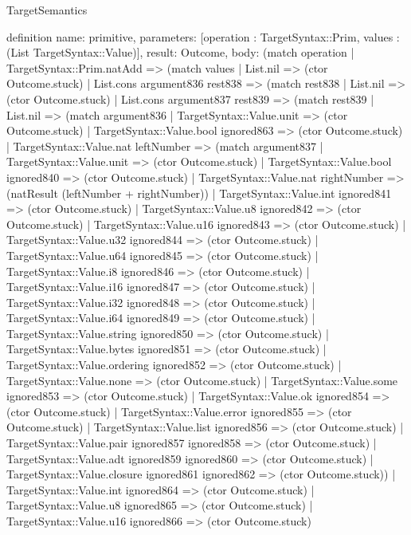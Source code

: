 \begin{lexlean}{TargetSemantics}
\begin{semanticmodule}
definition{
  name: primitive,
  parameters: [operation : TargetSyntax::Prim, values : (List TargetSyntax::Value)],
  result: Outcome,
  body: (match operation
    | TargetSyntax::Prim.natAdd => (match values
      | List.nil => (ctor Outcome.stuck)
      | List.cons argument836 rest838 => (match rest838
        | List.nil => (ctor Outcome.stuck)
        | List.cons argument837 rest839 => (match rest839
          | List.nil => (match argument836
            | TargetSyntax::Value.unit => (ctor Outcome.stuck)
            | TargetSyntax::Value.bool ignored863 => (ctor Outcome.stuck)
            | TargetSyntax::Value.nat leftNumber => (match argument837
              | TargetSyntax::Value.unit => (ctor Outcome.stuck)
              | TargetSyntax::Value.bool ignored840 => (ctor Outcome.stuck)
              | TargetSyntax::Value.nat rightNumber => (natResult (leftNumber + rightNumber))
              | TargetSyntax::Value.int ignored841 => (ctor Outcome.stuck)
              | TargetSyntax::Value.u8 ignored842 => (ctor Outcome.stuck)
              | TargetSyntax::Value.u16 ignored843 => (ctor Outcome.stuck)
              | TargetSyntax::Value.u32 ignored844 => (ctor Outcome.stuck)
              | TargetSyntax::Value.u64 ignored845 => (ctor Outcome.stuck)
              | TargetSyntax::Value.i8 ignored846 => (ctor Outcome.stuck)
              | TargetSyntax::Value.i16 ignored847 => (ctor Outcome.stuck)
              | TargetSyntax::Value.i32 ignored848 => (ctor Outcome.stuck)
              | TargetSyntax::Value.i64 ignored849 => (ctor Outcome.stuck)
              | TargetSyntax::Value.string ignored850 => (ctor Outcome.stuck)
              | TargetSyntax::Value.bytes ignored851 => (ctor Outcome.stuck)
              | TargetSyntax::Value.ordering ignored852 => (ctor Outcome.stuck)
              | TargetSyntax::Value.none => (ctor Outcome.stuck)
              | TargetSyntax::Value.some ignored853 => (ctor Outcome.stuck)
              | TargetSyntax::Value.ok ignored854 => (ctor Outcome.stuck)
              | TargetSyntax::Value.error ignored855 => (ctor Outcome.stuck)
              | TargetSyntax::Value.list ignored856 => (ctor Outcome.stuck)
              | TargetSyntax::Value.pair ignored857 ignored858 => (ctor Outcome.stuck)
              | TargetSyntax::Value.adt ignored859 ignored860 => (ctor Outcome.stuck)
              | TargetSyntax::Value.closure ignored861 ignored862 => (ctor Outcome.stuck))
            | TargetSyntax::Value.int ignored864 => (ctor Outcome.stuck)
            | TargetSyntax::Value.u8 ignored865 => (ctor Outcome.stuck)
            | TargetSyntax::Value.u16 ignored866 => (ctor Outcome.stuck)
}
\end{semanticmodule}
\end{lexlean}
